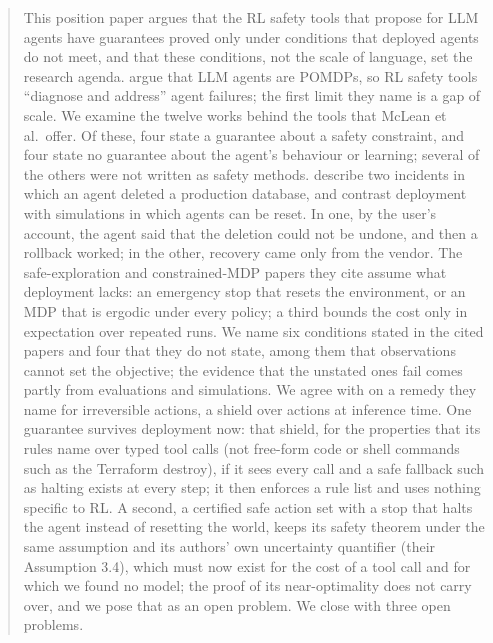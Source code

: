 \documentclass{article}
\begin{document}
\onecolumn
  \begin{icmlauthorlist}
  \end{icmlauthorlist}
  \vskip 0.3in

\printAffiliationsAndNotice{}

\begin{abstract}
This position paper argues that the RL safety tools that \citet{mclean2026} propose for LLM agents have guarantees proved only under conditions that deployed agents do not meet, and that these conditions, not the scale of language, set the research agenda. \citet{mclean2026} argue that LLM agents are POMDPs, so RL safety tools ``diagnose and address'' agent failures; the first limit they name is a gap of scale. We examine the twelve works behind the tools that McLean et al.~offer. Of these, four state a guarantee about a safety constraint, and four state no guarantee about the agent's behaviour or learning; several of the others were not written as safety methods. \citet{mclean2026} describe two incidents in which an agent deleted a production database, and contrast deployment with simulations in which agents can be reset. In one, by the user's account, the agent said that the deletion could not be undone, and then a rollback worked; in the other, recovery came only from the vendor. The safe-exploration and constrained-MDP papers they cite assume what deployment lacks: an emergency stop that resets the environment, or an MDP that is ergodic under every policy; a third bounds the cost only in expectation over repeated runs. We name six conditions stated in the cited papers and four that they do not state, among them that observations cannot set the objective; the evidence that the unstated ones fail comes partly from evaluations and simulations. We agree with \citet{mclean2026} on a remedy they name for irreversible actions, a shield over actions at inference time. One guarantee survives deployment now: that shield, for the properties that its rules name over typed tool calls (not free-form code or shell commands such as the Terraform destroy), if it sees every call and a safe fallback such as halting exists at every step; it then enforces a rule list and uses nothing specific to RL. A second, a certified safe action set with a stop that halts the agent instead of resetting the world, keeps its safety theorem under the same assumption and its authors' own uncertainty quantifier (their Assumption 3.4), which must now exist for the cost of a tool call and for which we found no model; the proof of its near-optimality does not carry over, and we pose that as an open problem. We close with three open problems.
\end{abstract}
\end{document}
